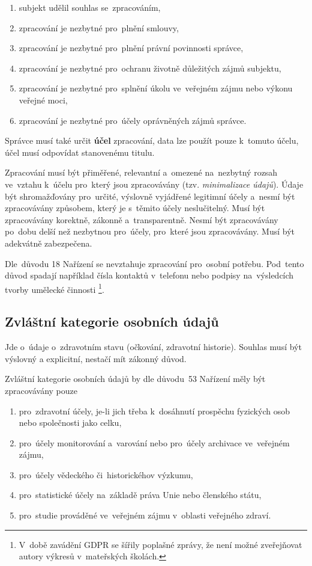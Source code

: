 \begin{enumerate}[label=\alph*)]
\item subjekt udělil souhlas se~zpracováním,
\item zpracování je nezbytné pro~plnění smlouvy,
\item zpracování je nezbytné pro~plnění právní povinnosti správce,
\item zpracování je nezbytné pro~ochranu životně důležitých zájmů subjektu,
\item zpracování je nezbytné pro~splnění úkolu ve~veřejném zájmu nebo výkonu veřejné moci,
\item zpracování je nezbytné pro~účely oprávněných zájmů správce.
\end{enumerate}

Správce musí také určit \textbf{účel} zpracování, data lze použít pouze k~tomuto účelu, účel musí odpovídat stanovenému titulu.

Zpracování musí být přiměřené, relevantní a~omezené na~nezbytný rozsah ve~vztahu k~účelu pro~který jsou zpracovávány (tzv. \emph{minimalizace údajů}).
Údaje být shromažďovány pro~určité, výslovně vyjádřené legitimní účely a~nesmí být zpracovávány způsobem, který je s~těmito účely neslučitelný.
Musí být zpracovávány korektně, zákonně a~transparentně.
Nesmí být zpracovávány po~dobu delší než nezbytnou pro~účely, pro~které jsou zpracovávány.
Musí být adekvátně zabezpečena.

Dle~důvodu 18 Nařízení se nevztahuje zpracování pro~osobní potřebu.
Pod~tento důvod spadají například čísla kontaktů v~telefonu nebo podpisy na~výsledcích tvorby umělecké činnosti%
\footnote{V~době zavádění GDPR se šířily poplašné zprávy, že není možné zveřejňovat autory výkresů v~mateřských školách.}.

\subsection{Zvláštní kategorie osobních údajů}

Jde o~údaje o~zdravotním stavu (očkování, zdravotní historie).
Souhlas musí být výslovný a explicitní, nestačí mít zákonný důvod.

Zvláštní kategorie osobních údajů by dle důvodu~53 Nařízení měly být zpracovávány pouze

\begin{enumerate}[label=\alph*)]
\item pro~zdravotní účely, je-li jich třeba k~dosáhnutí prospěchu fyzických osob nebo společnosti jako celku,
\item pro~účely monitorování a~varování nebo pro~účely archivace ve~veřejném zájmu,
\item pro~účely vědeckého či~historickéhov výzkumu,
\item pro~statistické účely na~základě práva Unie nebo členského státu,
\item pro~studie prováděné ve~veřejném zájmu v~oblasti veřejného zdraví.
\end{enumerate}

